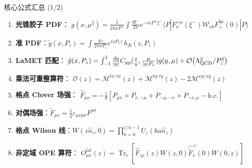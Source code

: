 \documentclass[10pt,aspectratio=169]{beamer}
\newcommand{\lqcd}{\Lambda_{\mathrm{QCD}}}
\newcommand{\trc}{\operatorname{Tr}_c}
\newcommand{\Pz}{P_z}
\begin{document}
\begin{frame}{核心公式汇总 (1/2)}
\small
\begin{enumerate}
  \item \textbf{光锥胶子 PDF}：
  $g(x,\mu^2) = \frac{1}{2\pi x P^+}\int\frac{d\xi^-}{2\pi} e^{-ixP^+\xi^-}\langle P|F^{+\mu}_a(\xi^-)\mathcal{W}_{ab}F^{b\mu}_+(0)|P\rangle$

  \item \textbf{准 PDF}：$\tilde{g}(x,\Pz) = \int\frac{dz}{2\pi x\Pz} e^{ix\Pz z}\,h_R(z,\Pz)$

  \item \textbf{LaMET 匹配}：
  $\tilde{g}(x,\Pz) = \int_{-1}^1\frac{dy}{|y|}C_{gg}(\frac{x}{y},\frac{\mu}{|y|\Pz})g(y,\mu) + \order{\lqcd^2/\Pz^2}$

  \item \textbf{乘法可重整算符}：
  $\mathcal{O}(z) = \mathcal{M}^{tx;tx}(z) + \mathcal{M}^{ty;ty}(z) - 2\mathcal{M}^{xy;xy}(z)$

  \item \textbf{格点 Clover 场强}：
  $\hat{F}_{\mu\nu} = -\frac{i}{8}[P_{\mu\nu}+P_{\nu,-\mu}+P_{-\mu,-\nu}+P_{-\nu,\mu} - \text{h.c.}]$

  \item \textbf{对偶场强}：$\tilde{F}_{\mu\nu} = \frac{1}{2}\varepsilon_{\mu\nu\rho\sigma}F^{\rho\sigma}$

  \item \textbf{格点 Wilson 线}：$W(z\hat{n}_z,0) = \prod_{k=0}^{z/a-1}U_z(ka\hat{n}_z)$

  \item \textbf{非定域 OPE 算符}：
  $O_{\mu\nu}^{\text{lat}}(z) = \trc[\hat{F}_{z\mu}(z)W(z,0)\hat{\tilde{F}}_{\nu}^{\,z}(0)W(0,z)]$
\end{enumerate}
\end{frame}
\end{document}
